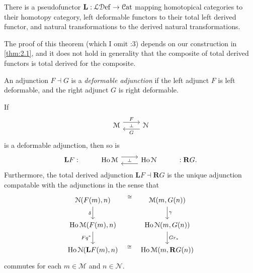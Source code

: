 \begin{theorem}\label{thm:2.2}
	There is a pseudofunctor $\mathbf{L} :\mathcal{L} \mathcal{D} \mathrm{ef} \to \mathcal{C}\mathrm{at} $ mapping homotopical categories to their homotopy category, left deformable functors to their total left derived functor, and natural transformations to the derived natural transformations.
\end{theorem}

The proof of this theorem (which I omit :3) depends on our construction in \cref{thm:2.1}, and it does not hold in generality that the composite of total derived functors is total derived for the composite.

\begin{definition}\label{dfn:2.8}
	An adjunction $F\dashv G$ is a \emph{deformable adjunction} if the left adjunct $F$ is left deformable, and the right adjunct $G$ is right deformable.
\end{definition}
\begin{theorem}\label{thm:2.3}
	If
\[\begin{tikzcd}
	{\mathcal{M}} & {\mathcal{N}}
	\arrow[""{name=0, anchor=center, inner sep=0}, "F", shift left=2, from=1-1, to=1-2]
	\arrow[""{name=1, anchor=center, inner sep=0}, "G", shift left=2, from=1-2, to=1-1]
	\arrow["\dashv"{anchor=center, rotate=-90}, draw=none, from=0, to=1]
\end{tikzcd}\]
is a deformable adjunction, then so is
\[\begin{tikzcd}
	{\mathbf{L}F:} & {\Ho\mathcal{M}} & {\Ho\mathcal{N}} & {:\mathbf{R}G}.
	\arrow[""{name=0, anchor=center, inner sep=0}, shift left=2, from=1-2, to=1-3]
	\arrow[""{name=1, anchor=center, inner sep=0}, shift left=2, from=1-3, to=1-2]
	\arrow["\dashv"{anchor=center, rotate=-90}, draw=none, from=0, to=1]
\end{tikzcd}\]
Furthermore, the total derived adjunction $\mathbf{L} F\dashv \mathbf{R}G $ is the unique adjunction compatable with the adjunctions in the sense that
\[\begin{tikzcd}
	{\mathcal{N}(F(m), n)} & {\mathcal{M}(m,G(n))} \\
	{\Ho\mathcal{M}(F(m),n)} & {\Ho\mathcal{N}(m,G(n))} \\
	{\Ho\mathcal{N}(\mathbf{L}F(m),n)} & {\Ho\mathcal{M}(m,\mathbf{R}G(n))}
	\arrow["\cong", draw=none, from=1-1, to=1-2]
	\arrow["\delta"', from=1-1, to=2-1]
	\arrow["\gamma", from=1-2, to=2-2]
	\arrow["{Fq^*}"', from=2-1, to=3-1]
	\arrow["{Gr_*}", from=2-2, to=3-2]
	\arrow["\cong", draw=none, from=3-1, to=3-2]
\end{tikzcd}\]
commutes for each $m\in \mathcal{M} $ and $n\in \mathcal{N} $.
\end{theorem}

